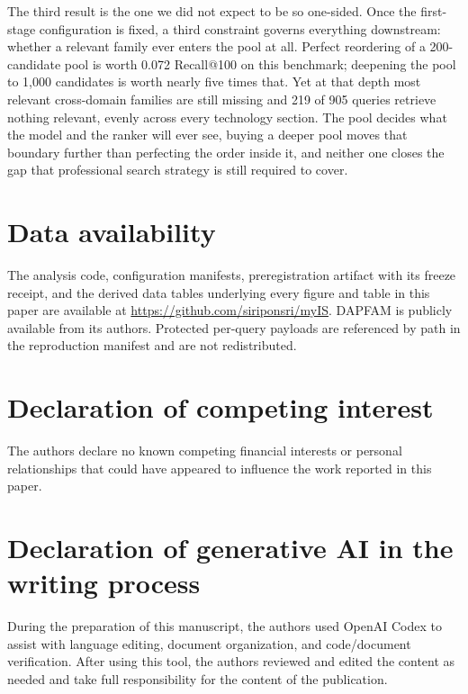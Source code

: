 \documentclass[preprint,11pt,authoryear]{elsarticle}
\begin{document}
The third result is the one we did not expect to be so one-sided. Once the first-stage configuration is fixed, a third constraint governs everything downstream: whether a relevant family ever enters the pool at all. Perfect reordering of a 200-candidate pool is worth 0.072 Recall@100 on this benchmark; deepening the pool to 1{,}000 candidates is worth nearly five times that. Yet at that depth most relevant cross-domain families are still missing and 219 of 905 queries retrieve nothing relevant, evenly across every technology section. The pool decides what the model and the ranker will ever see, buying a deeper pool moves that boundary further than perfecting the order inside it, and neither one closes the gap that professional search strategy is still required to cover.

\section*{Data availability}
\label{sec:data}

The analysis code, configuration manifests, preregistration artifact with its freeze receipt, and the derived data tables underlying every figure and table in this paper are available at \url{https://github.com/siriponsri/myIS}. DAPFAM is publicly available from its authors. Protected per-query payloads are referenced by path in the reproduction manifest and are not redistributed.

\section*{Declaration of competing interest}

The authors declare no known competing financial interests or personal relationships that could have appeared to influence the work reported in this paper.

\section*{Declaration of generative AI in the writing process}

\begin{sloppypar}
During the preparation of this manuscript, the authors used OpenAI Codex to assist with language editing, document organization, and code/document verification. After using this tool, the authors reviewed and edited the content as needed and take full responsibility for the content of the publication.
\end{sloppypar}
\end{document}
